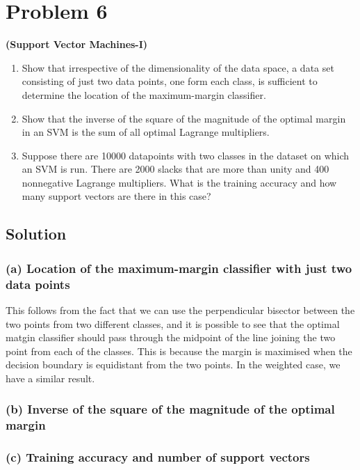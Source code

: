 \section*{Problem 6}

\textbf{(Support Vector Machines-I)}
\begin{enumerate}[label= (\alph*), noitemsep, topsep=0pt]
    \item Show that irrespective of the dimensionality of the data space, a data set consisting of just two data points, one form each class, is sufficient to determine the location of the maximum-margin classifier.

    \item Show that the inverse of the square of the magnitude of the optimal margin in an SVM is the sum of all optimal Lagrange multipliers.

    \item Suppose there are 10000 datapoints with two classes in the dataset on which an SVM is run. There are 2000 slacks that are more than unity and 400 nonnegative Lagrange multipliers. What is the training accuracy and how many support vectors are there in this case?
\end{enumerate}

\subsection*{Solution}

\subsubsection*{(a) Location of the maximum-margin classifier with just two data points}

This follows from the fact that we can use the perpendicular bisector between the two points from two different classes, and it is possible to see that the optimal matgin classifier should pass through the midpoint of the line joining the two point from each of the classes.
This is because the margin is maximised when the decision boundary is equidistant from the two points.
In the weighted case, we have a similar result.

\subsubsection*{(b) Inverse of the square of the magnitude of the optimal margin}

\subsubsection*{(c) Training accuracy and number of support vectors}
